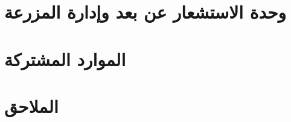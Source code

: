 \documentclass[12pt,a4paper]{report}
\begin{document}
\chapter{وحدة الاستشعار عن بعد وإدارة المزرعة}









\clearpage
{}

\chapter{الموارد المشتركة}
%








%
%
%
%
%
%

\chapter{الملاحق}




%
%
%
\end{document}
